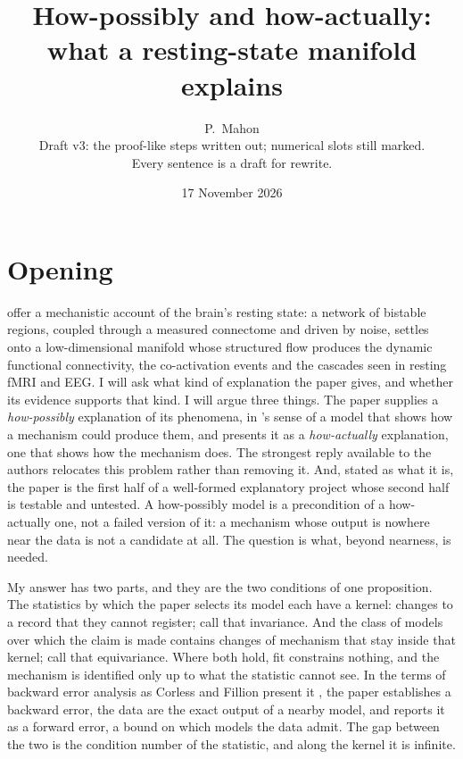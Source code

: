\documentclass[11pt]{article}
\title{How-possibly and how-actually:\\ what a resting-state manifold explains}
\author{P.~Mahon \\ \small Draft v3: the proof-like steps written out; numerical slots still marked. \\ \small Every sentence is a draft for rewrite.}
\date{17 November 2026}
\begin{document}
\maketitle

\section*{Opening}
\textcite{fousek2024} offer a mechanistic account of the brain's resting state: a network of bistable regions, coupled through a measured connectome and driven by noise, settles onto a low-dimensional manifold whose structured flow produces the dynamic functional connectivity, the co-activation events and the cascades seen in resting fMRI and EEG. I will ask what kind of explanation the paper gives, and whether its evidence supports that kind. I will argue three things. The paper supplies a \emph{how-possibly} explanation of its phenomena, in \textcite{craver2006}'s sense of a model that shows how a mechanism could produce them, and presents it as a \emph{how-actually} explanation, one that shows how the mechanism does. The strongest reply available to the authors relocates this problem rather than removing it. And, stated as what it is, the paper is the first half of a well-formed explanatory project whose second half is testable and untested. A how-possibly model is a precondition of a how-actually one, not a failed version of it: a mechanism whose output is nowhere near the data is not a candidate at all. The question is what, beyond nearness, is needed.

My answer has two parts, and they are the two conditions of one proposition. The statistics by which the paper selects its model each have a kernel: changes to a record that they cannot register; call that invariance. And the class of models over which the claim is made contains changes of mechanism that stay inside that kernel; call that equivariance. Where both hold, fit constrains nothing, and the mechanism is identified only up to what the statistic cannot see. In the terms of backward error analysis as Corless and Fillion present it \parencite{corless2016,fillion2014}, the paper establishes a backward error, the data are the exact output of a nearby model, and reports it as a forward error, a bound on which models the data admit. The gap between the two is the condition number of the statistic, and along the kernel it is infinite.
\end{document}
